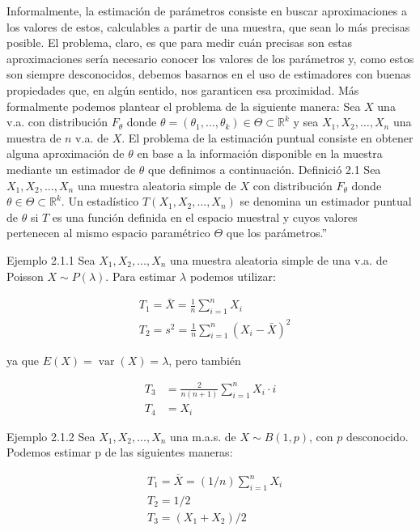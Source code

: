 \documentclass[
]{article}
\begin{document}
Informalmente, la estimación de parámetros consiste en buscar aproximaciones a los valores de estos, calculables a partir de una muestra, que sean lo más precisas posible. El problema, claro, es que para medir cuán precisas son estas aproximaciones sería necesario conocer los valores de los parámetros y, como estos son siempre desconocidos, debemos basarnos en el uso de estimadores con buenas propiedades que, en algún sentido, nos garanticen esa proximidad.
Más formalmente podemos plantear el problema de la siguiente manera:
Sea \(X\) una v.a. con distribución \(F_{\theta}\) donde \(\theta=\left(\theta_{1}, \ldots, \theta_{k}\right) \in \Theta \subset \mathbb{R}^{k}\) y sea \(X_{1}, X_{2}, \ldots, X_{n}\) una muestra de \(n\) v.a. de \(X\). El problema de la estimación puntual consiste en obtener alguna aproximación de \(\theta\) en base a la información disponible en la muestra mediante un estimador de \(\theta\) que definimos a continuación.
Definició 2.1 Sea \(X_{1}, X_{2}, \ldots, X_{n}\) una muestra aleatoria simple de \(X\) con distribución \(F_{\theta}\) donde \(\theta \in \Theta \subset \mathbb{R}^{k}\). Un estadístico \(T\left(X_{1}, X_{2}, \ldots, X_{n}\right)\) se denomina un estimador puntual de \(\theta\) si \(T\) es una función definida en el espacio muestral y cuyos valores pertenecen al mismo espacio paramétrico \(\Theta\) que los parámetros.''

Ejemplo 2.1.1 Sea \(X_{1}, X_{2}, \ldots, X_{n}\) una muestra aleatoria simple de una v.a. de Poisson \(X \sim P(\lambda)\). Para estimar \(\lambda\) podemos utilizar:

\[
\begin{aligned}
& T_{1}=\bar{X}=\frac{1}{n} \sum_{i=1}^{n} X_{i} \\
& T_{2}=s^{2}=\frac{1}{n} \sum_{i=1}^{n}\left(X_{i}-\bar{X}\right)^{2}
\end{aligned}
\]

ya que \(E(X)=\operatorname{var}(X)=\lambda\), pero también

\[
\begin{aligned}
T_{3} & =\frac{2}{n(n+1)} \sum_{i=1}^{n} X_{i} \cdot i \\
T_{4} & =X_{i}
\end{aligned}
\]

Ejemplo 2.1.2 Sea \(X_{1}, X_{2}, \ldots, X_{n}\) una m.a.s. de \(X \sim B(1, p)\), con \(p\) desconocido. Podemos estimar p de las siguientes maneras:

\[
\begin{aligned}
& T_{1}=\bar{X}=(1 / n) \sum_{i=1}^{n} X_{i} \\
& T_{2}=1 / 2 \\
& T_{3}=\left(X_{1}+X_{2}\right) / 2
\end{aligned}
\]
\end{document}
